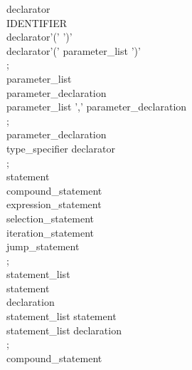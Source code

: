 \documentclass[11pt]{article}
\begin{document}
{declarator\\
\hspace*{1cm} IDENTIFIER \\
\hspace*{1cm}   declarator'(' ')'\\
\hspace*{1cm}   declarator'(' parameter\_list ')'\\
\hspace*{1cm};\\
parameter\_list\\
\hspace*{1cm} parameter\_declaration\\
\hspace*{1cm}   parameter\_list ',' parameter\_declaration\\
\hspace*{1cm};\\
parameter\_declaration\\
\hspace*{1cm} type\_specifier declarator\\
\hspace*{1cm};\\
statement\\
\hspace*{1cm} compound\_statement\\
\hspace*{1cm}   expression\_statement\\
\hspace*{1cm}   selection\_statement\\
\hspace*{1cm}   iteration\_statement\\
\hspace*{1cm}   jump\_statement\\
\hspace*{1cm};\\
statement\_list\\
\hspace*{1cm} statement\\
\hspace*{1cm}   declaration\\
\hspace*{1cm}   statement\_list statement\\
\hspace*{1cm}   statement\_list declaration\\
\hspace*{1cm};\\
compound\_statement\\
}
\end{document}
